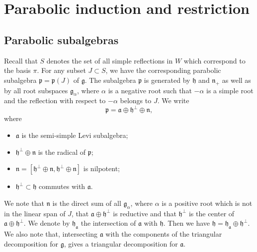 \documentclass[a4paper]{amsart}
\begin{document}
\section{Parabolic induction and restriction}\label{s2}

\subsection{Parabolic subalgebras}\label{s2.1}

Recall that $S$ denotes the set of all simple reflections in $W$ which 
correspond to the basis $\pi$. For any subset $J\subset S$, we
have the corresponding parabolic subalgebra $\mathfrak{p}=\mathfrak{p}(J)$
of $\mathfrak{g}$. The subalgebra $\mathfrak{p}$ is generated by
$\mathfrak{h}$ and $\mathfrak{n}_+$ as well as by all root subspaces
$\mathfrak{g}_\alpha$, where $\alpha$ is a negative root such that 
$-\alpha$ is a simple root and the reflection with respect to 
$-\alpha$ belongs to $J$. We write
\begin{displaymath}
\mathfrak{p}=\mathfrak{a}\oplus \mathfrak{h}^{\perp}\oplus \mathfrak{n}, 
\end{displaymath}
where 
\begin{itemize}
\item $\mathfrak{a}$ is the semi-simple Levi subalgebra;
\item $\mathfrak{h}^{\perp}\oplus \mathfrak{n}$ is the radical
of $\mathfrak{p}$;
\item $\mathfrak{n}=[\mathfrak{h}^{\perp}\oplus \mathfrak{n},
\mathfrak{h}^{\perp}\oplus \mathfrak{n}]$ is nilpotent;
\item $\mathfrak{h}^{\perp}\subset \mathfrak{h}$ commutes with
$\mathfrak{a}$.
\end{itemize}
We note that 
$\mathfrak{n}$ is the direct sum of all 
$\mathfrak{g}_\alpha$, where $\alpha$ is a positive root which is
not in the linear span of $J$, that
$\mathfrak{a}\oplus \mathfrak{h}^{\perp}$ is reductive
and that $\mathfrak{h}^{\perp}$ is the center of 
$\mathfrak{a}\oplus \mathfrak{h}^{\perp}$. We denote by
$\mathfrak{h}_\mathfrak{a}$ the intersection of $\mathfrak{a}$
with $\mathfrak{h}$. Then we have 
$\mathfrak{h}=\mathfrak{h}_\mathfrak{a}\oplus\mathfrak{h}^{\perp}$.
We also note that, intersecting $\mathfrak{a}$ with the components of the
triangular decomposition for $\mathfrak{g}$, gives a triangular decomposition
for $\mathfrak{a}$.
\end{document}
